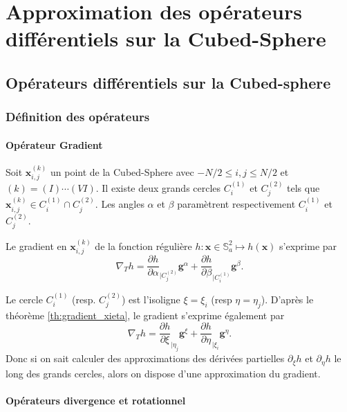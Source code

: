 
\chapter{Approximation des opérateurs différentiels sur la Cubed-Sphere}

\section{Opérateurs différentiels sur la Cubed-sphere}

\subsection{Définition des opérateurs}

\subsubsection{Opérateur Gradient}

Soit $\mathbf{x}_{i,j}^{(k)}$ un point de la Cubed-Sphere avec $- N/2 \leq i,j \leq N/2$ et $(k) = (I) \cdots (VI)$. Il existe deux grands cercles $C_i^{(1)}$ et $C_j^{(2)}$ tels que $\mathbf{x}_{i,j}^{(k)} \in C_i^{(1)} \cap C^{(2)}_j$. Les angles $\alpha$ et $\beta$ paramètrent respectivement $C_i^{(1)}$ et $C_j^{(2)}$.

Le gradient en $\mathbf{x}_{i,j}^{(k)}$ de la fonction régulière $h : \mathbf{x} \in \mathbb{S}_a^2 \mapsto h(\mathbf{x})$ s'exprime par 
\begin{equation}
\nabla_T h = \dfrac{\partial h}{\partial \alpha}_{|C^{(2)}_j} \mathbf{g}^{\alpha} + \dfrac{\partial h}{\partial \beta}_{|C^{(1)}_i} \mathbf{g}^{\beta}.
\end{equation}

Le cercle $C_i^{(1)}$ (resp. $C_j^{(2)}$) est l'isoligne $\xi = \xi_i$ (resp $\eta = \eta_j$). D'après le théorème \ref{th:gradient_xieta}, le gradient s'exprime également par 
\begin{equation}
\nabla_T h = \dfrac{\partial h}{\partial \xi}_{|\eta_j} \mathbf{g}^{\xi} + \dfrac{\partial h}{\partial \eta}_{|\xi_i} \mathbf{g}^{\eta}.
\end{equation}
Donc si on sait calculer des approximations des dérivées partielles $\partial_{\xi}h$ et $\partial_{\eta}h$ le long des grands cercles, alors on dispose d'une approximation du gradient.

\subsubsection{Opérateurs divergence et rotationnel}

